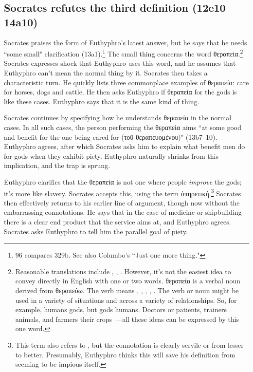 \documentclass[11pt]{article}
\begin{document}
\subsection{Socrates refutes the third definition (12e10--14a10)}

Socrates praises the form of Euthyphro's latest answer, but he says that he needs ``some small" clarification (13a1).\footnote{\citet{bailly2003} 96 compares  329b.  See also Columbo's ``Just one more thing."}  The small thing concerns the word {\g θεραπεία}.\footnote{Reasonable translations include , , .  However, it's not the easiest idea to convey directly in English with one or two words.  {\g θεραπεία} is a verbal noun derived from {\g θεραπεύω}.  The verb means , , , , .  The verb or noun might be used in a variety of situations and across a variety of relationships.  So, for example, humans  gods, but gods  humans.  Doctors  or  patients, trainers  animals, and farmers  their crops~---all these ideas can be expressed by this one word.}  Socrates expresses shock that Euthyphro uses this word, and he assumes that Euthyphro can't mean the normal thing by it.  Socrates then takes a characteristic turn.  He quickly lists three commonplace examples of {\g θεραπεία}: care for horses, dogs and cattle.  He then asks Euthyphro if θεραπεία for the gods is like these cases.  Euthyphro says that it is the same kind of thing.

Socrates continues by specifying how he understands {\g θεραπεία} in the normal cases.  In all such cases, the person performing the {\g θεραπεία} aims ``at some good and benefit for the one being cared for ({\g τοῦ θεραπευομένου})" (13b7--10).  Euthyphro agrees, after which Socrates asks him to explain what benefit men do for gods when they exhibit piety.  Euthyphro naturally shrinks from this implication, and the trap is sprung.

Euthyphro clarifies that the {\g θεραπεία} is not one where people \emph{improve} the gods; it's more like slavery.  Socrates accepts this, using the term {\g ὑπηρετική}.\footnote{This term also refers to , but the connotation is clearly servile or from lesser to better.  Presumably, Euthyphro thinks this will save his definition from seeming to be impious itself.}  Socrates then effectively returns to his earlier line of argument, though now without the embarrassing connotations.  He says that in the case of medicine or shipbuilding there is a clear end product that the service aims at, and Euthyphro agrees.  Socrates asks Euthyphro to tell him the parallel goal of piety.
\end{document}
